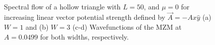 \begin{figure}[!ht]
  \\
  \caption{Spectral flow of a hollow triangle with $L=50$, and $\mu=0$ for increasing linear vector potential strength defined by $\vec{A} = -Ax\hat{y}$ (a) $W=1$ and (b) $W=3$ (c-d) Wavefunctions of the MZM at $A=0.0499$ for both widths, respectively.}
  \label{fig: linear-increasing}
\end{figure}

